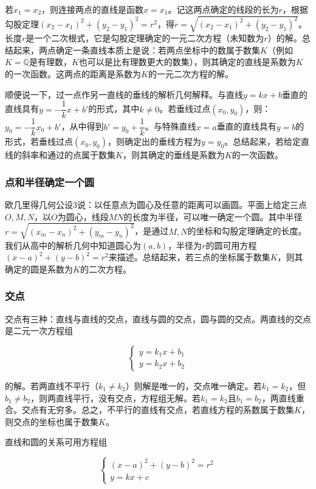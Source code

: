 \documentclass[b5paper]{ctexart}
\begin{document}
若$x_1 = x_2$，则连接两点的直线是函数$x = x_1$。记这两点确定的线段的长为$r$，根据勾股定理$(x_2 - x_1)^2 + (y_2 - y_1)^2 = r^2$，得$r = \sqrt{(x_2 - x_1)^2 + (y_2 - y_1)^2}$。长度$r$是一个二次根式，它是勾股定理确定的一元二次方程（未知数为$r$）的解。总结起来，两点确定一条直线本质上是说：若两点坐标中的数属于数集$K$（例如$K = \mathbb{Q}$是有理数，$K$也可以是比有理数更大的数集），则其确定的直线是系数为$K$的一次函数。这两点的距离是系数为$K$的一元二次方程的解。

顺便说一下，过一点作另一直线的垂线的解析几何解释。与直线$y = kx + b$垂直的直线具有$y = -\dfrac{1}{k} x + b'$的形式，其中$k \ne 0$。若垂线过点$(x_0, y_0)$，则：$y_0 = -\dfrac{1}{k} x_0 + b'$，从中得到$b' = y_0 + \dfrac{1}{k}$。与特殊直线$x = a$垂直的直线具有$y = b$的形式，若垂线过点$(x_0, y_0)$，则确定出的垂线方程为$y = y_0$。总结起来，若给定直线的斜率和通过的点属于数集$K$，则其确定的垂线是系数为$K$的一次函数。

\subsubsection{点和半径确定一个圆}

欧几里得几何公设3说：以任意点为圆心及任意的距离可以画圆。平面上给定三点$O, M, N$，以$O$为圆心，线段$MN$的长度为半径，可以唯一确定一个圆。其中半径$r = \sqrt{(x_m - x_n)^2 + (y_m - y_n)^2}$，是通过$M, N$的坐标和勾股定理确定的长度。我们从高中的解析几何中知道圆心为$(a, b)$，半径为$r$的圆可用方程$(x - a)^2 + (y - b)^2 = r^2$来描述。总结起来，若三点的坐标属于数集$K$，则其确定的圆是系数为$K$的二次方程。

\subsubsection{交点}
交点有三种：直线与直线的交点，直线与圆的交点，圆与圆的交点。两直线的交点是二元一次方程组

\[
\begin{cases}
y = k_1 x + b_1 \\
y = k_2 x + b_2
\end{cases}
\]

的解。若两直线不平行（$k_1 \ne k_2$）则解是唯一的，交点唯一确定。若$k_1 = k_2$，但$b_1 \ne b_2$，则两直线平行，没有交点，方程组无解。若$k_1 = k_2$且$b_1 = b_2$，两直线重合。交点有无穷多。总之，不平行的直线有交点，若直线方程的系数属于数集$K$，则交点的坐标也属于数集$K$。

直线和圆的关系可用方程组

\[
\begin{cases}
(x - a)^2 + (y - b)^2 = r^2 \\
y = kx + c
\end{cases}
\]
\end{document}
